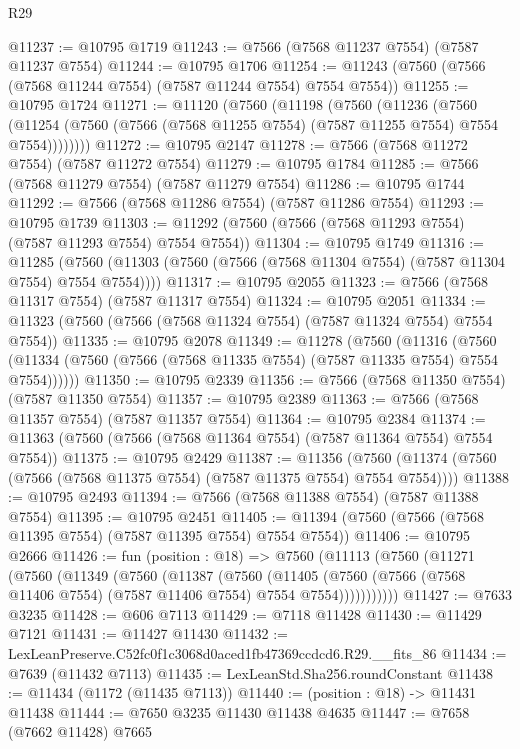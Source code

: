 \begin{lexlean}{R29}
\begin{coremodule}
@11237 := @10795 @1719
@11243 := @7566 (@7568 @11237 @7554) (@7587 @11237 @7554)
@11244 := @10795 @1706
@11254 := @11243 (@7560 (@7566 (@7568 @11244 @7554) (@7587 @11244 @7554) @7554 @7554))
@11255 := @10795 @1724
@11271 := @11120
    (@7560
      (@11198
        (@7560
          (@11236
            (@7560
              (@11254 (@7560 (@7566 (@7568 @11255 @7554) (@7587 @11255 @7554) @7554 @7554))))))))
@11272 := @10795 @2147
@11278 := @7566 (@7568 @11272 @7554) (@7587 @11272 @7554)
@11279 := @10795 @1784
@11285 := @7566 (@7568 @11279 @7554) (@7587 @11279 @7554)
@11286 := @10795 @1744
@11292 := @7566 (@7568 @11286 @7554) (@7587 @11286 @7554)
@11293 := @10795 @1739
@11303 := @11292 (@7560 (@7566 (@7568 @11293 @7554) (@7587 @11293 @7554) @7554 @7554))
@11304 := @10795 @1749
@11316 := @11285
    (@7560 (@11303 (@7560 (@7566 (@7568 @11304 @7554) (@7587 @11304 @7554) @7554 @7554))))
@11317 := @10795 @2055
@11323 := @7566 (@7568 @11317 @7554) (@7587 @11317 @7554)
@11324 := @10795 @2051
@11334 := @11323 (@7560 (@7566 (@7568 @11324 @7554) (@7587 @11324 @7554) @7554 @7554))
@11335 := @10795 @2078
@11349 := @11278
    (@7560
      (@11316
        (@7560 (@11334 (@7560 (@7566 (@7568 @11335 @7554) (@7587 @11335 @7554) @7554 @7554))))))
@11350 := @10795 @2339
@11356 := @7566 (@7568 @11350 @7554) (@7587 @11350 @7554)
@11357 := @10795 @2389
@11363 := @7566 (@7568 @11357 @7554) (@7587 @11357 @7554)
@11364 := @10795 @2384
@11374 := @11363 (@7560 (@7566 (@7568 @11364 @7554) (@7587 @11364 @7554) @7554 @7554))
@11375 := @10795 @2429
@11387 := @11356
    (@7560 (@11374 (@7560 (@7566 (@7568 @11375 @7554) (@7587 @11375 @7554) @7554 @7554))))
@11388 := @10795 @2493
@11394 := @7566 (@7568 @11388 @7554) (@7587 @11388 @7554)
@11395 := @10795 @2451
@11405 := @11394 (@7560 (@7566 (@7568 @11395 @7554) (@7587 @11395 @7554) @7554 @7554))
@11406 := @10795 @2666
@11426 := fun (position : @18) =>
  @7560
    (@11113
      (@7560
        (@11271
          (@7560
            (@11349
              (@7560
                (@11387
                  (@7560
                    (@11405
                      (@7560 (@7566 (@7568 @11406 @7554) (@7587 @11406 @7554) @7554 @7554)))))))))))
@11427 := @7633 @3235
@11428 := @606 @7113
@11429 := @7118 @11428
@11430 := @11429 @7121
@11431 := @11427 @11430
@11432 := LexLeanPreserve.C52fc0f1c3068d0aced1fb47369ccdcd6.R29.__fits_86
@11434 := @7639 (@11432 @7113)
@11435 := LexLeanStd.Sha256.roundConstant
@11438 := @11434 (@1172 (@11435 @7113))
@11440 := (position : @18) -> @11431 @11438
@11444 := @7650 @3235 @11430 @11438 @4635
@11447 := @7658 (@7662 @11428) @7665

\end{coremodule}
\end{lexlean}
